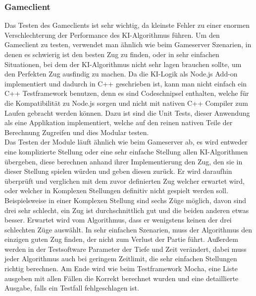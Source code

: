 \documentclass[12pt,a4paper,bibliography=totocnumbered,listof=totocnumbered]{article}
\begin{document}
\subsubsection{Gameclient}
Das Testen des Gameclients ist sehr wichtig, da kleinste Fehler zu einer enormen Verschlechterung der Performance des KI-Algorithmus führen.
Um den Gameclient zu testen, verwendet man ähnlich wie beim Gameserver Szenarien, in denen es schwierig ist den besten Zug zu finden, oder 
in sehr einfachen Situationen, bei dem der KI-Algorithmus nicht sehr lagen brauchen sollte, um den Perfekten Zug ausfindig zu machen.
Da die KI-Logik als Node.js Add-on implementiert und dadurch in C++ geschrieben ist, kann man nicht einfach ein C++ Testframework benutzen, 
denn es sind Codeschnipsel enthalten, welche für die Kompatibilität zu Node.js sorgen und nicht mit nativen C++ Compiler zum Laufen gebracht werden können.
Dazu ist sind die Unit Tests, dieser Anwendung als eine Applikation implementiert, welche auf den reinen nativen Teile der Berechnung Zugreifen und 
dies Modular testen. 
\\
Das Testen der Module läuft ähnlich wie beim Gameserver ab, es wird entweder eine komplizierte Stellung oder eine sehr einfache Stellung 
allen KI-Algorithmen übergeben, diese berechnen anhand ihrer Implementierung den Zug, den sie in dieser Stellung spielen würden und
geben diesen zurück. Er wird daraufhin überprüft und verglichen mit dem zuvor definierten Zug welcher erwartet wird, oder welcher in 
Komplexen Stellungen definitiv nicht gespielt werden soll. Beispielsweise in einer Komplexen Stellung sind sechs Züge möglich, davon sind drei sehr schlecht,
ein Zug ist durchschnittlich gut und die beiden anderen etwas besser. Erwartet wird vom Algorithmus, dass er wenigstens keinen der drei schlechten Züge
auswählt. In sehr einfachen Szenarien, muss der Algorithmus den einzigen guten Zug finden, der nicht zum Verlust der Partie führt. 
Außerdem werden in der Testsoftware Parameter der Tiefe und Zeit verändert, dabei muss jeder Algorithmus auch bei geringem Zeitlimit, die sehr einfachen
Stellungen richtig berechnen. Am Ende wird wie beim Testframework Mocha, eine Liste ausgeben mit allen Fällen die Korrekt berechnet wurden und 
eine detaillierte Ausgabe, falls ein Testfall fehlgeschlagen ist. 



\pagebreak
\end{document}
